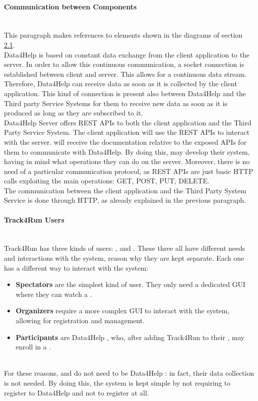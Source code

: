 \documentclass[../../DD.tex]{subfiles}
\begin{document}
	\paragraph{Communication between Components}\mbox{}\\
	\indent This paragraph makes references to elements shown in the diagrams of section \hyperref[sect:2.1]{2.1}.\\
	\indent Data4Help is based on constant data exchange from the client application to the server. In order to allow this continuous communication, a socket connection is established between client and server. This allows for a continuous data stream. Therefore, Data4Help can receive data as soon as it is collected by the client application. This kind of connection is present also between Data4Help and the Third party Service Systems for them to receive new data as soon as it is produced as long as they are subscribed to it.\\
	\indent Data4Help Server offers REST APIs to both the client application and the Third Party Service System. The client application will use the REST APIs to interact with the server.  will receive the documentation relative to the exposed APIs for them to communicate with Data4Help. By doing this,  may develop their system, having in mind what operations they can do on the server. Moreover, there is no need of a particular communication protocol, as REST APIs are just basic HTTP calls exploiting the main operations: GET, POST, PUT, DELETE.\\
	\indent The communication between the client application and the Third Party System Service is done through HTTP, as already explained in the previous paragraph.

	\paragraph{Track4Run Users}\mbox{}\\
	\indent Track4Run has three kinds of users: ,  and . These three all have different needs and interactions with the system, reason why they are kept separate. Each one has a different way to interact with the system:
	\begin{itemize}
		\item\textbf{Spectators} are the simplest kind of user. They only need a dedicated GUI where they can watch a .
		\item\textbf{Organizers} require a more complex GUI to interact with the system, allowing for registration and  management.
		\item\textbf{Participants} are Data4Help , who, after adding Track4Run to their , may enroll in a . 
	\end{itemize}\mbox{}\\
	\indent For these reasons,  and  do not need to be Data4Help : in fact, their data collection is not needed. By doing this, the system is kept simple by not requiring  to register to Data4Help and  not to register at all.
\end{document}
